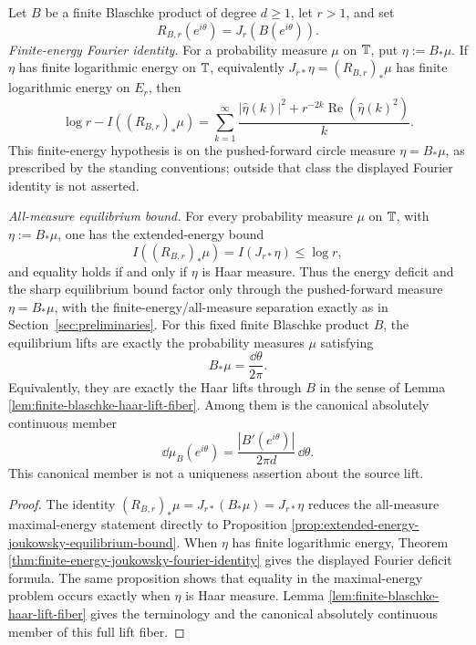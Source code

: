 \begin{theorem}\label{thm:finite-blaschke-joukowsky-cover}
Let \(B\) be a finite Blaschke product of degree \(d\ge1\), let \(r>1\), and set
\[
R_{B,r}(e^{i\theta})=J_r(B(e^{i\theta})).
\]
\emph{Finite-energy Fourier identity.}  For a probability measure \(\mu\) on \(\mathbb{T}\), put \(\eta:=B_\ast\mu\).  If \(\eta\) has finite logarithmic energy on \(\mathbb{T}\), equivalently \(J_{r\ast}\eta=(R_{B,r})_\ast\mu\) has finite logarithmic energy on \(E_r\), then
\[
\log r-I((R_{B,r})_\ast\mu)
=\sum_{k=1}^{\infty}
\frac{|\widehat\eta(k)|^2+r^{-2k}\operatorname{Re}(\widehat\eta(k)^2)}{k}.
\]
This finite-energy hypothesis is on the pushed-forward circle measure
\(\eta=B_\ast\mu\), as prescribed by the standing conventions; outside
that class the displayed Fourier identity is not asserted.

\emph{All-measure equilibrium bound.}  For every probability measure \(\mu\) on \(\mathbb{T}\), with \(\eta:=B_\ast\mu\), one has the extended-energy bound
\[
I((R_{B,r})_\ast\mu)
=I(J_{r\ast}\eta)
\le \log r,
\]
and equality holds if and only if \(\eta\) is Haar measure.  Thus the energy deficit and the sharp equilibrium bound factor only through the pushed-forward measure \(\eta=B_\ast\mu\), with the finite-energy/all-measure separation exactly as in Section~\ref{sec:preliminaries}.  For this fixed finite Blaschke product \(B\), the equilibrium lifts are exactly the probability measures \(\mu\) satisfying
\[
B_\ast\mu=\frac{\dd\theta}{2\pi}.
\]
Equivalently, they are exactly the Haar lifts through \(B\) in the sense of
Lemma \ref{lem:finite-blaschke-haar-lift-fiber}.  Among them is the
canonical absolutely continuous member
\[
\boxed{\;
\dd\mu_B(e^{i\theta})=\frac{|B'(e^{i\theta})|}{2\pi d}\,\dd\theta.
\;}
\]
This canonical member is not a uniqueness assertion about the source lift.
\end{theorem}

\begin{proof}
The identity \((R_{B,r})_\ast\mu=J_{r\ast}(B_\ast\mu)=J_{r\ast}\eta\) reduces the all-measure maximal-energy statement directly to Proposition \ref{prop:extended-energy-joukowsky-equilibrium-bound}.  When \(\eta\) has finite logarithmic energy, Theorem \ref{thm:finite-energy-joukowsky-fourier-identity} gives the displayed Fourier deficit formula.  The same proposition shows that equality in the maximal-energy problem occurs exactly when \(\eta\) is Haar measure.  Lemma \ref{lem:finite-blaschke-haar-lift-fiber} gives the terminology and the canonical absolutely continuous member of this full lift fiber.
\end{proof}

